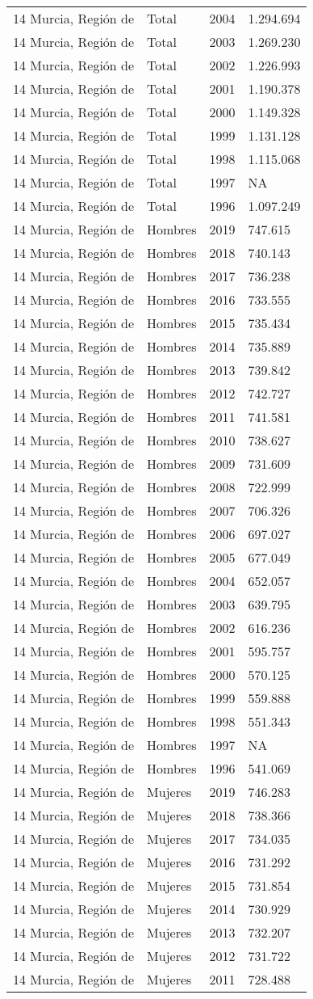 \documentclass[
]{article}
\begin{document}
\begin{longtable}[]{@{}llrl@{}}
14 Murcia, Región de & Total & 2004 & 1.294.694\tabularnewline
14 Murcia, Región de & Total & 2003 & 1.269.230\tabularnewline
14 Murcia, Región de & Total & 2002 & 1.226.993\tabularnewline
14 Murcia, Región de & Total & 2001 & 1.190.378\tabularnewline
14 Murcia, Región de & Total & 2000 & 1.149.328\tabularnewline
14 Murcia, Región de & Total & 1999 & 1.131.128\tabularnewline
14 Murcia, Región de & Total & 1998 & 1.115.068\tabularnewline
14 Murcia, Región de & Total & 1997 & NA\tabularnewline
14 Murcia, Región de & Total & 1996 & 1.097.249\tabularnewline
14 Murcia, Región de & Hombres & 2019 & 747.615\tabularnewline
14 Murcia, Región de & Hombres & 2018 & 740.143\tabularnewline
14 Murcia, Región de & Hombres & 2017 & 736.238\tabularnewline
14 Murcia, Región de & Hombres & 2016 & 733.555\tabularnewline
14 Murcia, Región de & Hombres & 2015 & 735.434\tabularnewline
14 Murcia, Región de & Hombres & 2014 & 735.889\tabularnewline
14 Murcia, Región de & Hombres & 2013 & 739.842\tabularnewline
14 Murcia, Región de & Hombres & 2012 & 742.727\tabularnewline
14 Murcia, Región de & Hombres & 2011 & 741.581\tabularnewline
14 Murcia, Región de & Hombres & 2010 & 738.627\tabularnewline
14 Murcia, Región de & Hombres & 2009 & 731.609\tabularnewline
14 Murcia, Región de & Hombres & 2008 & 722.999\tabularnewline
14 Murcia, Región de & Hombres & 2007 & 706.326\tabularnewline
14 Murcia, Región de & Hombres & 2006 & 697.027\tabularnewline
14 Murcia, Región de & Hombres & 2005 & 677.049\tabularnewline
14 Murcia, Región de & Hombres & 2004 & 652.057\tabularnewline
14 Murcia, Región de & Hombres & 2003 & 639.795\tabularnewline
14 Murcia, Región de & Hombres & 2002 & 616.236\tabularnewline
14 Murcia, Región de & Hombres & 2001 & 595.757\tabularnewline
14 Murcia, Región de & Hombres & 2000 & 570.125\tabularnewline
14 Murcia, Región de & Hombres & 1999 & 559.888\tabularnewline
14 Murcia, Región de & Hombres & 1998 & 551.343\tabularnewline
14 Murcia, Región de & Hombres & 1997 & NA\tabularnewline
14 Murcia, Región de & Hombres & 1996 & 541.069\tabularnewline
14 Murcia, Región de & Mujeres & 2019 & 746.283\tabularnewline
14 Murcia, Región de & Mujeres & 2018 & 738.366\tabularnewline
14 Murcia, Región de & Mujeres & 2017 & 734.035\tabularnewline
14 Murcia, Región de & Mujeres & 2016 & 731.292\tabularnewline
14 Murcia, Región de & Mujeres & 2015 & 731.854\tabularnewline
14 Murcia, Región de & Mujeres & 2014 & 730.929\tabularnewline
14 Murcia, Región de & Mujeres & 2013 & 732.207\tabularnewline
14 Murcia, Región de & Mujeres & 2012 & 731.722\tabularnewline
14 Murcia, Región de & Mujeres & 2011 & 728.488\tabularnewline

\end{longtable}
\end{document}
